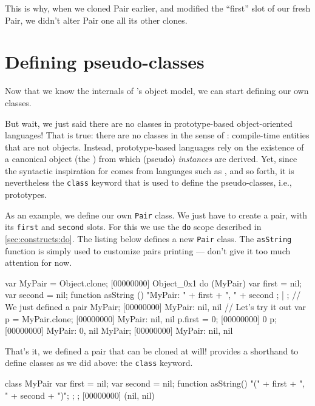 This is why, when we cloned Pair earlier, and modified the ``first'' slot of
our fresh Pair, we didn't alter Pair one all its other clones.

\section{Defining pseudo-classes}
\label{sec:tut:class}

Now that we know the internals of \us's object model, we can start defining
our own classes.

But wait, we just said there are no classes in prototype-based
object-oriented languages!  That is true: there are no classes in the sense
of \Cxx: compile-time entities that are not objects.  Instead,
prototype-based languages rely on the existence of a canonical object (the
) from which (pseudo) \emph{instances} are derived.  Yet,
since the syntactic inspiration for \us comes from languages such as \Java,
\Cxx and so forth, it is nevertheless the \lstinline|class| keyword that is
used to define the pseudo-classes, i.e., prototypes.

As an example, we define our own \lstinline{Pair} class. We just have to
create a pair, with its \lstinline|first| and \lstinline|second| slots. For
this we use the \lstinline{do} scope described in
\autoref{sec:constructs:do}. The listing below defines a new
\lstinline{Pair} class. The \lstinline{asString} function is simply used to
customize pairs printing --- don't give it too much attention for now.

\begin{urbiscript}[firstnumber=1]
var MyPair = Object.clone;
[00000000] Object_0x1
do (MyPair)
{
  var first = nil;
  var second = nil;
  function asString ()
  {
    "MyPair: " + first + ", " + second
  };
} | {};
// We just defined a pair
MyPair;
[00000000] MyPair: nil, nil
// Let's try it out
var p = MyPair.clone;
[00000000] MyPair: nil, nil
p.first = 0;
[00000000] 0
p;
[00000000] MyPair: 0, nil
MyPair;
[00000000] MyPair: nil, nil
\end{urbiscript}

That's it, we defined a pair that can be cloned at will! \us provides a
shorthand to define classes as we did above: the \lstinline{class} keyword.

\begin{urbiscript}[firstnumber=1]
class MyPair
{
  var first = nil;
  var second = nil;
  function asString() { "(" + first + ", " + second + ")"; };
};
[00000000] (nil, nil)
\end{urbiscript}

